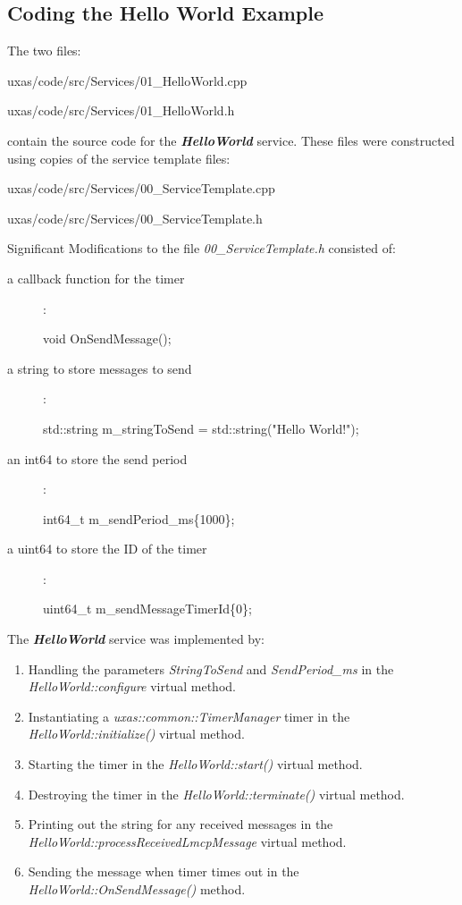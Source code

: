 \subsection{Coding the Hello World Example}
The two files:
\begin{docspec}
    uxas/code/src/Services/01\_HelloWorld.cpp
\end{docspec}
\begin{docspec}
    uxas/code/src/Services/01\_HelloWorld.h
\end{docspec}
contain the source code for the \textbf{\textit{HelloWorld}} service. These files were constructed using copies of the service template files:
\begin{docspec}
    uxas/code/src/Services/00\_ServiceTemplate.cpp
\end{docspec}
\begin{docspec}
    uxas/code/src/Services/00\_ServiceTemplate.h
\end{docspec}
Significant Modifications to the file \textit{00\_ServiceTemplate.h} consisted of:
\begin{description}
\item[a callback function for the timer]:\begin{docspec}void OnSendMessage();\end{docspec}
\item[a string to store messages to send]:\begin{docspec}std::string m\_stringToSend = std::string("Hello World!");\end{docspec}
\item[an int64 to store the send period]:\begin{docspec}int64\_t m\_sendPeriod\_ms\{1000\};\end{docspec}
\item[a uint64 to store the ID of the timer]:\begin{docspec}uint64\_t m\_sendMessageTimerId\{0\}; \end{docspec}
\end{description}

The \textbf{\textit{HelloWorld}} service was implemented by:
\begin{enumerate}
\item Handling the parameters \textit{StringToSend} and \textit{SendPeriod\_ms} in the \textit{HelloWorld::configure} virtual method.
\item Instantiating a \textit{uxas::common::TimerManager} timer in the \textit{HelloWorld::initialize()} virtual method.
\item Starting the timer in the \textit{HelloWorld::start()} virtual method.
\item Destroying the timer in the \textit{HelloWorld::terminate()} virtual method.
\item Printing out the string for any received messages in the \textit{HelloWorld::processReceivedLmcpMessage} virtual method.
\item Sending the message when timer times out in the \textit{HelloWorld::OnSendMessage()} method.
\end{enumerate}




